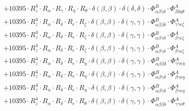 \documentclass{article}
\begin{document}
\begin{subequations}
\begin{gather}
\begin{array}{c}
 \\[0.2em] 		 + 10395 \cdot R_{z}^{4} \cdot R_{\alpha{}} \cdot R_{\gamma{}} \cdot R_{\eta{}} \cdot R_{\theta{}} \cdot \delta{}\left(\beta{}, \beta{}\right) \cdot \delta{}\left(\delta{}, \delta{}\right) \cdot \Phi{}^{B}_{\alpha{}\beta{}\gamma{}\delta{}} \cdot \Phi{}^{A}_{\beta{}\delta{}\eta{}\theta{}} 
 \\[0.2em] 		 + 10395 \cdot R_{z}^{4} \cdot R_{\alpha{}} \cdot R_{\delta{}} \cdot R_{\epsilon{}} \cdot R_{\zeta{}} \cdot \delta{}\left(\beta{}, \beta{}\right) \cdot \delta{}\left(\gamma{}, \gamma{}\right) \cdot \Phi{}^{B}_{\alpha{}\beta{}\beta{}\delta{}} \cdot \Phi{}^{A}_{\gamma{}\gamma{}\epsilon{}\zeta{}} 
 \\[0.2em] 		 + 10395 \cdot R_{z}^{4} \cdot R_{\alpha{}} \cdot R_{\delta{}} \cdot R_{\epsilon{}} \cdot R_{\zeta{}} \cdot \delta{}\left(\beta{}, \beta{}\right) \cdot \delta{}\left(\gamma{}, \gamma{}\right) \cdot \Phi{}^{B}_{\alpha{}\beta{}\gamma{}\delta{}} \cdot \Phi{}^{A}_{\beta{}\gamma{}\epsilon{}\zeta{}} 
 \\[0.2em] 		 + 10395 \cdot R_{z}^{4} \cdot R_{\alpha{}} \cdot R_{\delta{}} \cdot R_{\epsilon{}} \cdot R_{\zeta{}} \cdot \delta{}\left(\beta{}, \beta{}\right) \cdot \delta{}\left(\gamma{}, \gamma{}\right) \cdot \Phi{}^{B}_{\alpha{}\beta{}\gamma{}\delta{}} \cdot \Phi{}^{A}_{\beta{}\gamma{}\epsilon{}\zeta{}} 
 \\[0.2em] 		 + 10395 \cdot R_{z}^{4} \cdot R_{\alpha{}} \cdot R_{\delta{}} \cdot R_{\epsilon{}} \cdot R_{\eta{}} \cdot \delta{}\left(\beta{}, \beta{}\right) \cdot \delta{}\left(\gamma{}, \gamma{}\right) \cdot \Phi{}^{B}_{\alpha{}\beta{}\beta{}\delta{}} \cdot \Phi{}^{A}_{\gamma{}\gamma{}\epsilon{}\eta{}} 
 \\[0.2em] 		 + 10395 \cdot R_{z}^{4} \cdot R_{\alpha{}} \cdot R_{\delta{}} \cdot R_{\epsilon{}} \cdot R_{\eta{}} \cdot \delta{}\left(\beta{}, \beta{}\right) \cdot \delta{}\left(\gamma{}, \gamma{}\right) \cdot \Phi{}^{B}_{\alpha{}\beta{}\gamma{}\delta{}} \cdot \Phi{}^{A}_{\beta{}\gamma{}\epsilon{}\eta{}} 
 \\[0.2em] 		 + 10395 \cdot R_{z}^{4} \cdot R_{\alpha{}} \cdot R_{\delta{}} \cdot R_{\epsilon{}} \cdot R_{\eta{}} \cdot \delta{}\left(\beta{}, \beta{}\right) \cdot \delta{}\left(\gamma{}, \gamma{}\right) \cdot \Phi{}^{B}_{\alpha{}\beta{}\gamma{}\delta{}} \cdot \Phi{}^{A}_{\beta{}\gamma{}\epsilon{}\eta{}} 
 \\[0.2em] 		 + 10395 \cdot R_{z}^{4} \cdot R_{\alpha{}} \cdot R_{\delta{}} \cdot R_{\epsilon{}} \cdot R_{\theta{}} \cdot \delta{}\left(\beta{}, \beta{}\right) \cdot \delta{}\left(\gamma{}, \gamma{}\right) \cdot \Phi{}^{B}_{\alpha{}\beta{}\beta{}\delta{}} \cdot \Phi{}^{A}_{\gamma{}\gamma{}\epsilon{}\theta{}} 

\end{array}
\end{gather}
\end{subequations}
\end{document}
